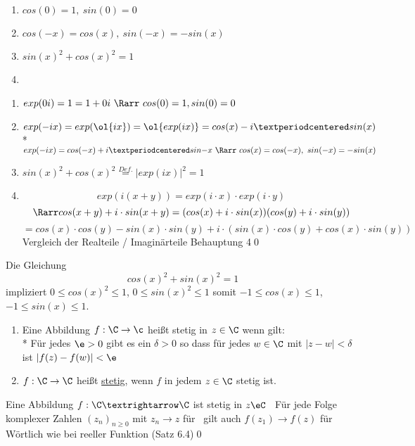 \begin{enumerate}
\item{$cos(0)=1,\ sin(0)=0$}
\item{$cos(-x)=cos(x),\ sin(-x)=-sin(x)$}
\item{$sin(x)^2+cos(x)^2=1$}
\item{}
\end{enumerate}
\bew
\begin{enumerate}
\item{$exp(0i)=1=1+0i\ \Rarr\ cos(0)=1, sin(0)=0$}
\item{$exp(-ix)=exp(\ol{ix})=\ol{exp(ix)}=cos(x)-i·sin(x)$\\*
$exp(-ix)=cos(-x)+i·sin{-x}\ \Rarr\ cos(x)=cos(-x),\ sin(-x)=-sin(x)$}
\item{$sin(x)^2+cos(x)^2\overset{Def.}{=}|exp(ix)|^2=1$}
\item{$$exp(i(x+y)) = exp(i \cdot x) \cdot exp(i \cdot y)$$
$$\Rarr cos(x+y) + i \cdot sin(x+y) = (cos(x) + i \cdot sin(x))(cos(y) + i \cdot sin(y))$$
$$=cos(x) \cdot cos(y) - sin(x) \cdot sin(y) + i \cdot (sin(x) \cdot cos(y) + cos(x) \cdot sin(y))$$
Vergleich der Realteile / Imaginärteile \Rarr{} Behauptung 4\qed}
\end{enumerate}

\bem
	Die Gleichung $$cos(x)^2 + sin(x)^2 = 1$$
	impliziert $0 \leq cos(x)^2 \leq 1$, $0 \leq sin(x)^2 \leq 1$ somit $-1 \leq cos(x) \leq 1$, $-1 \leq sin(x) \leq 1$.

	\begin{enumerate}
	\item{Eine Abbildung $f: \C \to \c$ heißt stetig in $z \in \C$ wenn gilt:\\*
	Für jedes $\e > 0$ gibt es ein $\delta > 0$ so dass für jedes $w \in \C$ mit $|z - w| < \delta$ ist $|f(z) - f(w)| < \e$}
	\item{$f: \C \to \C$ heißt \ul{stetig}, wenn $f$ in jedem $z \in \C$ stetig ist.}
	\end{enumerate}

Eine Abbildung $f:\C→\C$ ist stetig in $z\eC$ \equ\ Für jede Folge komplexer Zahlen $(z_n)_{n\geq 0}$ mit $z_n→z$ für \nif\ gilt auch $f(z_1)→f(z)$ für \nif
\bew
Wörtlich wie bei reeller Funktion (Satz 6.4)\qed

